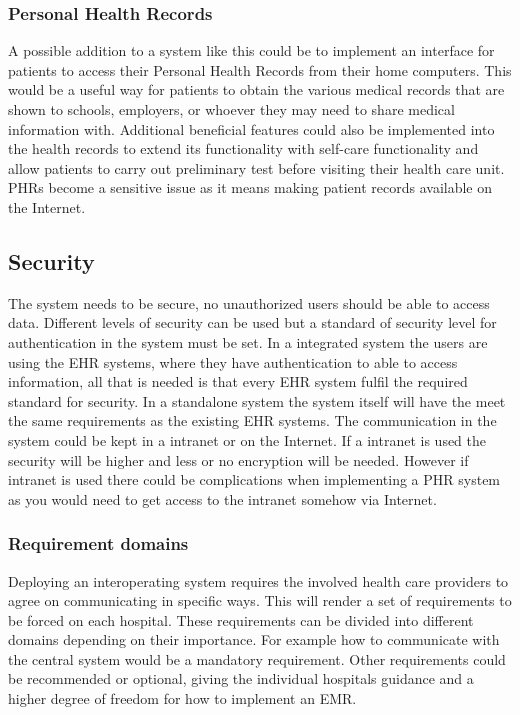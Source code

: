 \documentclass[14pt]{article}
\begin{document}
\subsubsection{Personal Health Records}
A possible addition to a system like this could be to implement an interface for patients to access their Personal Health Records from their home computers. This would be a useful way for patients to obtain the various medical records that are shown to schools, employers, or whoever they may need to share medical information with. Additional beneficial features could also be implemented into the health records to extend its functionality with self-care functionality and allow patients to carry out preliminary test before visiting their health care unit. \glspl{PHR} become a sensitive issue as it means making patient records available on the Internet.

\subsection{Security}
The system needs to be secure, no unauthorized users should be able to access data. Different levels of security can be used but a standard of security level for authentication in the system must be set. In a integrated system the users are using the \gls{EHR} systems, where they have authentication to able to access information, all that is needed is that every EHR system fulfil the required standard for security. In a standalone system the system itself will have the meet the same requirements as the existing \gls{EHR} systems. 
The communication in the system could be kept in a intranet or on the Internet. If a intranet is used the security will be higher and less or no encryption will be needed. However if intranet is used there could be complications when implementing a \gls{PHR} system as you would need to get access to the intranet somehow via Internet.

\subsubsection{Requirement domains}
Deploying an interoperating system requires the involved health care providers to agree on communicating in specific ways. This will render a set of requirements to be forced on each hospital. These requirements can be divided into different domains depending on their importance. For example how to communicate with the central system would be a mandatory requirement. Other requirements could be recommended or optional, giving the individual hospitals guidance and a higher degree of freedom for how to implement an \gls{EMR}.
\end{document}
